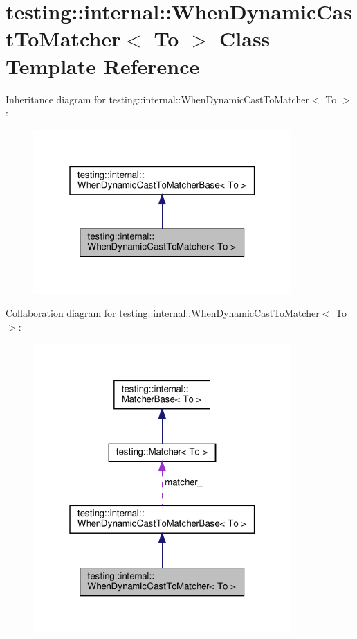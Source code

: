 \hypertarget{classtesting_1_1internal_1_1_when_dynamic_cast_to_matcher}{}\section{testing\+:\+:internal\+:\+:When\+Dynamic\+Cast\+To\+Matcher$<$ To $>$ Class Template Reference}
\label{classtesting_1_1internal_1_1_when_dynamic_cast_to_matcher}


Inheritance diagram for testing\+:\+:internal\+:\+:When\+Dynamic\+Cast\+To\+Matcher$<$ To $>$\+:
\nopagebreak
\begin{figure}[H]
\begin{center}
\leavevmode
\includegraphics[width=280pt]{classtesting_1_1internal_1_1_when_dynamic_cast_to_matcher__inherit__graph}
\end{center}
\end{figure}


Collaboration diagram for testing\+:\+:internal\+:\+:When\+Dynamic\+Cast\+To\+Matcher$<$ To $>$\+:
\nopagebreak
\begin{figure}[H]
\begin{center}
\leavevmode
\includegraphics[width=280pt]{classtesting_1_1internal_1_1_when_dynamic_cast_to_matcher__coll__graph}
\end{center}
\end{figure}
